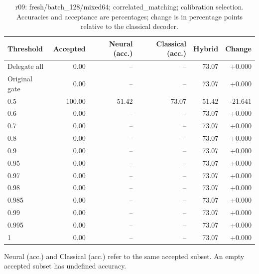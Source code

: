 \begin{table}[htbp]
\centering\small
\setlength{\tabcolsep}{3pt}
\caption{r09: fresh/batch\_128/mixed64; correlated\_matching; calibration selection. Accuracies and acceptance are percentages; change is in percentage points relative to the classical decoder.}
\begin{tabular}{lrrrrr}
\toprule
Threshold & Accepted & Neural (acc.) & Classical (acc.) & Hybrid & Change \\
\midrule
Delegate all & 0.00 & -- & -- & 73.07 & +0.000 \\
Original gate & 0.00 & -- & -- & 73.07 & +0.000 \\
0.5 & 100.00 & 51.42 & 73.07 & 51.42 & -21.641 \\
0.6 & 0.00 & -- & -- & 73.07 & +0.000 \\
0.7 & 0.00 & -- & -- & 73.07 & +0.000 \\
0.8 & 0.00 & -- & -- & 73.07 & +0.000 \\
0.9 & 0.00 & -- & -- & 73.07 & +0.000 \\
0.95 & 0.00 & -- & -- & 73.07 & +0.000 \\
0.97 & 0.00 & -- & -- & 73.07 & +0.000 \\
0.98 & 0.00 & -- & -- & 73.07 & +0.000 \\
0.985 & 0.00 & -- & -- & 73.07 & +0.000 \\
0.99 & 0.00 & -- & -- & 73.07 & +0.000 \\
0.995 & 0.00 & -- & -- & 73.07 & +0.000 \\
1 & 0.00 & -- & -- & 73.07 & +0.000 \\
\bottomrule
\end{tabular}
\par\smallskip\footnotesize Neural (acc.) and Classical (acc.) refer to the same accepted subset. An empty accepted subset has undefined accuracy.
\end{table}
